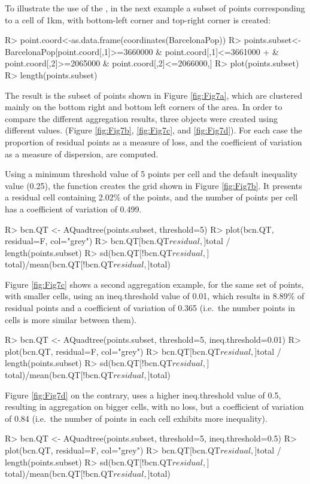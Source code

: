 To illustrate the use of the , in the next example a subset of points corresponding to a cell of 1km, with bottom-left corner  and top-right corner  is created:
%
\begin{example*}
R> point.coord<-as.data.frame(coordinates(BarcelonaPop))
R> points.subset<- BarcelonaPop[point.coord[,1]>=3660000 & point.coord[,1]<=3661000
 +		 & point.coord[,2]>=2065000 & point.coord[,2]<=2066000,]
R> plot(points.subset)
R> length(points.subset)
\end{example*}
%
The result is the subset of points shown in Figure \ref{fig:Fig7a}, which are clustered mainly on the bottom right and bottom left corners of the area. In order to compare the different aggregation results, three  objects were created using different  values. (Figure \ref{fig:Fig7b}, \ref{fig:Fig7c}, and \ref{fig:Fig7d}). For each case the proportion of residual points as a measure of loss, and the coefficient of variation as a measure of dispersion, are computed.

Using a minimum threshold value of 5 points per cell and the default inequality value (0.25), the function creates the grid shown in Figure \ref{fig:Fig7b}. It presents a residual cell containing 2.02\% of the points, and the number of points per cell has a coefficient of variation of 0.499.
%
\begin{example*}
R> bcn.QT <- AQuadtree(points.subset, threshold=5)
R> plot(bcn.QT, residual=F, col="grey")
R> bcn.QT[bcn.QT$residual,]$total / length(points.subset)
R> sd(bcn.QT[!bcn.QT$residual,]$total)/mean(bcn.QT[!bcn.QT$residual,]$total)
\end{example*}
%
Figure \ref{fig:Fig7c} shows a second aggregation example, for the same set of points, with smaller cells, using an ineq.threshold value of 0.01, which results in 8.89\% of residual points and a coefficient of variation of 0.365 (i.e.\ the number points in cells is more similar between them).
%
\begin{example*}
R> bcn.QT <- AQuadtree(points.subset, threshold=5, ineq.threshold=0.01)
R> plot(bcn.QT, residual=F, col="grey")
R> bcn.QT[bcn.QT$residual,]$total / length(points.subset)
R> sd(bcn.QT[!bcn.QT$residual,]$total)/mean(bcn.QT[!bcn.QT$residual,]$total)
\end{example*}
%
Figure \ref{fig:Fig7d} on the contrary, uses a higher ineq.threshold value of 0.5, resulting in aggregation on bigger cells, with no loss, but a coefficient of variation of 0.84 (i.e.\ the number of points in each cell exhibits more inequality).
%
\begin{example*}
R> bcn.QT <- AQuadtree(points.subset, threshold=5, ineq.threshold=0.5)
R> plot(bcn.QT, residual=F, col="grey")
R> bcn.QT[bcn.QT$residual,]$total / length(points.subset)
R> sd(bcn.QT[!bcn.QT$residual,]$total)/mean(bcn.QT[!bcn.QT$residual,]$total)
\end{example*}
%

